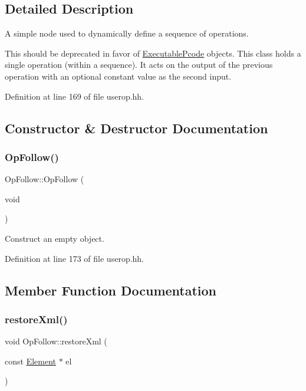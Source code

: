 \subsection{Detailed Description}
A simple node used to dynamically define a sequence of operations. 

This should be deprecated in favor of \mbox{\hyperlink{class_executable_pcode}{Executable\+Pcode}} objects. This class holds a single operation (within a sequence). It acts on the output of the previous operation with an optional constant value as the second input. 

Definition at line 169 of file userop.\+hh.



\subsection{Constructor \& Destructor Documentation}
\mbox{\label{struct_op_follow_a5eb345f3be76c5ff4b0c90f4a4a64091}} 
\subsubsection{\texorpdfstring{OpFollow()}{OpFollow()}}
{\footnotesize\ttfamily Op\+Follow\+::\+Op\+Follow (\begin{DoxyParamCaption}\item[{void}]{ }\end{DoxyParamCaption})\hspace{0.3cm}{\ttfamily [inline]}}



Construct an empty object. 



Definition at line 173 of file userop.\+hh.



\subsection{Member Function Documentation}
\mbox{\label{struct_op_follow_a31cd6faa65b443adea57d0830b87d16b}} 
\subsubsection{\texorpdfstring{restoreXml()}{restoreXml()}}
{\footnotesize\ttfamily void Op\+Follow\+::restore\+Xml (\begin{DoxyParamCaption}\item[{const \mbox{\hyperlink{class_element}{Element}} $\ast$}]{el }\end{DoxyParamCaption})}



